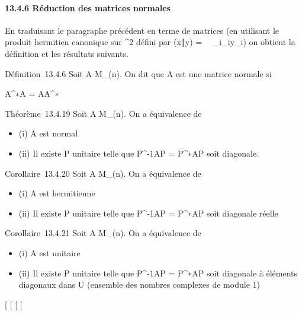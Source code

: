 \documentclass[]{article}
\begin{document}
\paragraph{13.4.6 Réduction des matrices normales}

En traduisant le paragraphe précédent en terme de matrices (en utilisant
le produit hermitien canonique sur ^2 défini par
(x∣y) =\
\sum ~
_i\overlinex_iy_i) on
obtient la définition et les résultats suivants.

Définition~13.4.6 Soit A \in M_(n). On dit que A est une matrice
normale si

A^∗A = AA^∗

Théorème~13.4.19 Soit A \in M_(n). On a équivalence de

\begin{itemize}
\itemsep1pt\parskip0pt
\item
  (i) A est normal
\item
  (ii) Il existe P unitaire telle que P^-1AP =
  P^∗AP soit diagonale.
\end{itemize}

Corollaire~13.4.20 Soit A \in M_(n). On a équivalence de

\begin{itemize}
\itemsep1pt\parskip0pt
\item
  (i) A est hermitienne
\item
  (ii) Il existe P unitaire telle que P^-1AP =
  P^∗AP soit diagonale réelle
\end{itemize}

Corollaire~13.4.21 Soit A \in M_(n). On a équivalence de

\begin{itemize}
\itemsep1pt\parskip0pt
\item
  (i) A est unitaire
\item
  (ii) Il existe P unitaire telle que P^-1AP =
  P^∗AP soit diagonale à éléments diagonaux dans U (ensemble
  des nombres complexes de module 1)
\end{itemize}

{[}
{[}
{[}
{[}
\end{document}
